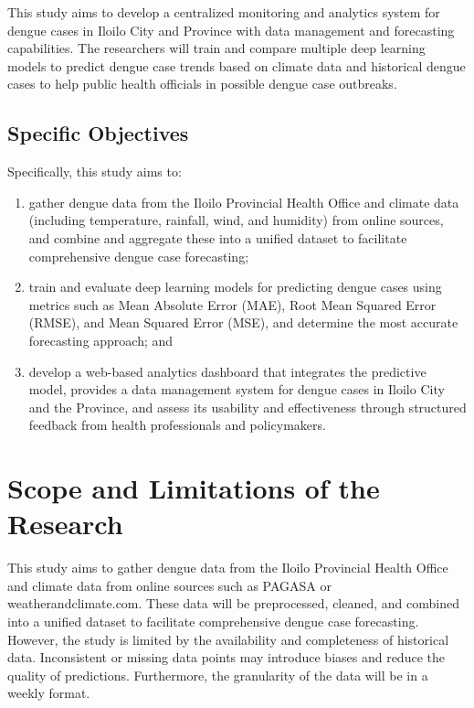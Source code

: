 This study aims to develop a centralized monitoring and analytics system for dengue cases in Iloilo City and Province with data management and forecasting capabilities. 
The researchers will train and compare multiple deep learning models to predict dengue case trends based on climate data and 
historical dengue cases to help public health officials in possible dengue case outbreaks.


\subsection{Specific Objectives}
\label{sec:specificobjectives}

%
%

Specifically, this study aims to:


\begin{enumerate}
	\item gather dengue data from the Iloilo Provincial Health Office and climate data (including temperature, rainfall, wind, and humidity) from online sources, and combine and aggregate these into a unified dataset to facilitate comprehensive dengue case forecasting;
	\item train and evaluate deep learning models for predicting dengue cases using metrics such as Mean Absolute Error (MAE), Root Mean Squared Error (RMSE), and Mean Squared Error (MSE), and determine the most accurate forecasting approach; and
	\item develop a web-based analytics dashboard that integrates the predictive model, provides a data management system for dengue cases in Iloilo City and the Province, and assess its usability and effectiveness through structured feedback from health professionals and policymakers.
\end{enumerate}

\section{Scope and Limitations of the Research}
\label{sec:scopelimitations}

This study aims to gather dengue data from the Iloilo Provincial Health Office and climate data from online sources such as PAGASA or weatherandclimate.com. These data will be preprocessed, cleaned, and combined into a unified dataset to facilitate comprehensive dengue case forecasting. However, the study is limited by the availability and completeness of historical data. Inconsistent or missing data points may introduce biases and reduce the quality of predictions. Furthermore, the granularity of the data will be in a weekly format.

